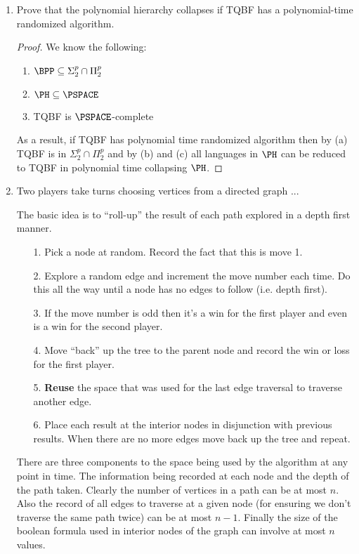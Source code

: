 \documentclass[usletter]{article}
\begin{document}
\begin{enumerate}
  \item Prove that the polynomial hierarchy collapses if TQBF has a polynomial-time randomized algorithm.

    \begin{proof}
      We know the following:

      \begin{enumerate}
        \item $\BPP \subseteq \Sigma_{2}^{p} \cap \Pi_{2}^{p}$
        \item $\PH \subseteq \PSPACE$
        \item TQBF is $\PSPACE$-complete
      \end{enumerate}

      As a result, if TQBF has polynomial time randomized algorithm then by (a) TQBF is in $\Sigma_{2}^{p} \cap \Pi_{2}^{p}$ and by (b) and (c) all languages in $\PH$ can be reduced to TQBF in polynomial time collapsing $\PH$.
    \end{proof}

  \item Two players take turns choosing vertices from a directed graph ...

    The basic idea is to ``roll-up'' the result of each path explored in a depth first manner.

   \begin{itemize}
     \item[1.] Pick a node at random. Record the fact that this is move 1.
     \item[2.] Explore a random edge and increment the move number each time. Do this all the way until a node has no edges to follow (i.e. depth first).
     \item[3.] If the move number is odd then it's a win for the first player and even is a win for the second player.
     \item[4.] Move ``back'' up the tree to the parent node and record the win or loss for the first player.
     \item[5.] \textbf{Reuse} the space that was used for the last edge traversal to traverse another edge.
     \item[6.] Place each result at the interior nodes in disjunction with previous results. When there are no more edges move back up the tree and repeat.
   \end{itemize}

   There are three components to the space being used by the algorithm at any point in time. The information being recorded at each node and the depth of the path taken. Clearly the number of vertices in a path can be at most $n$. Also the record of all edges to traverse at a given node (for ensuring we don't traverse the same path twice) can be at most $n-1$. Finally the size of the boolean formula used in interior nodes of the graph can involve at most $n$ values.


\end{enumerate}
\end{document}

